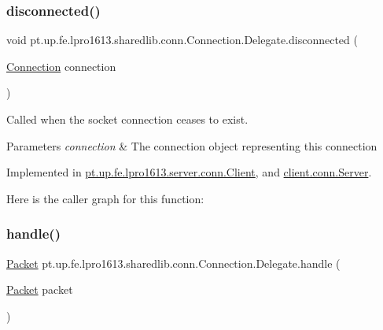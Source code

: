 \subsubsection{\texorpdfstring{disconnected()}{disconnected()}}
{\footnotesize\ttfamily void pt.\+up.\+fe.\+lpro1613.\+sharedlib.\+conn.\+Connection.\+Delegate.\+disconnected (\begin{DoxyParamCaption}\item[{\hyperlink{classpt_1_1up_1_1fe_1_1lpro1613_1_1sharedlib_1_1conn_1_1_connection}{Connection}}]{connection }\end{DoxyParamCaption})}

Called when the socket connection ceases to exist.


\begin{DoxyParams}{Parameters}
{\em connection} & The connection object representing this connection \\
\hline
\end{DoxyParams}


Implemented in \hyperlink{classpt_1_1up_1_1fe_1_1lpro1613_1_1server_1_1conn_1_1_client_a8aaec34bb1c5d5af0430318b105ac3fc}{pt.\+up.\+fe.\+lpro1613.\+server.\+conn.\+Client}, and \hyperlink{classclient_1_1conn_1_1_server_ae2a0ab226b1622da8e19137fb89bdc81}{client.\+conn.\+Server}.

Here is the caller graph for this function\+:
\hypertarget{interfacept_1_1up_1_1fe_1_1lpro1613_1_1sharedlib_1_1conn_1_1_connection_1_1_delegate_a5b0f77e34d93967ae53cf7e01f0e2835}{}\label{interfacept_1_1up_1_1fe_1_1lpro1613_1_1sharedlib_1_1conn_1_1_connection_1_1_delegate_a5b0f77e34d93967ae53cf7e01f0e2835} 
\subsubsection{\texorpdfstring{handle()}{handle()}}
{\footnotesize\ttfamily \hyperlink{classpt_1_1up_1_1fe_1_1lpro1613_1_1sharedlib_1_1conn_1_1_packet}{Packet} pt.\+up.\+fe.\+lpro1613.\+sharedlib.\+conn.\+Connection.\+Delegate.\+handle (\begin{DoxyParamCaption}\item[{\hyperlink{classpt_1_1up_1_1fe_1_1lpro1613_1_1sharedlib_1_1conn_1_1_packet}{Packet}}]{packet }\end{DoxyParamCaption})}


